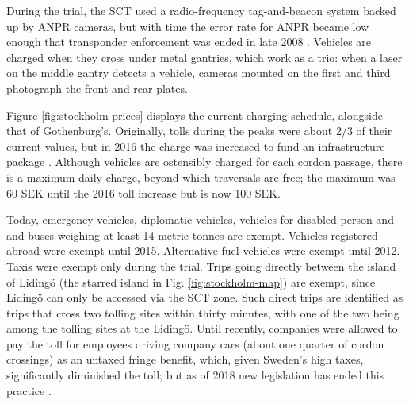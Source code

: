 During the trial, the SCT used a radio-frequency tag-and-beacon system backed up by ANPR cameras, but with time the error rate for ANPR became low enough that transponder enforcement was ended in late 2008 \citep[p. 841]{Hamilton2011}. Vehicles are charged when they cross under metal gantries, which work as a trio: when a laser on the middle gantry detects a vehicle, cameras mounted on the first and third photograph the front and rear plates.

Figure \ref{fig:stockholm-prices} displays the current charging schedule, alongside that of Gothenburg's. Originally, tolls during the peaks were about 2/3 of their current values, but in 2016 the charge was increased to fund an infrastructure package \citep{Borjesson2018}. Although vehicles are ostensibly charged for each cordon passage, there is a maximum daily charge, beyond which traversals are free; the maximum was 60 SEK until the 2016 toll increase but is now 100 SEK. 

Today, emergency vehicles, diplomatic vehicles, vehicles for disabled person and and buses weighing at least 14 metric tonnes are exempt. Vehicles registered abroad were exempt until 2015. Alternative-fuel vehicles were exempt until 2012. Taxis were exempt only during the trial. Trips going directly between the island of Liding\"o (the starred island in Fig. \ref{fig:stockholm-map}) are exempt, since Liding\"o can only be accessed via the SCT zone. Such direct trips are identified as trips that cross two tolling sites within thirty minutes, with one of the two being among the tolling sites at the Liding\"o. Until recently, companies were allowed to pay the toll for employees driving company cars (about one quarter of cordon crossings) as an untaxed fringe benefit, which, given Sweden's high taxes, significantly diminished the toll; but as of 2018 new legislation has ended this practice \citep[Sec. 2.2]{Borjesson2018}.

